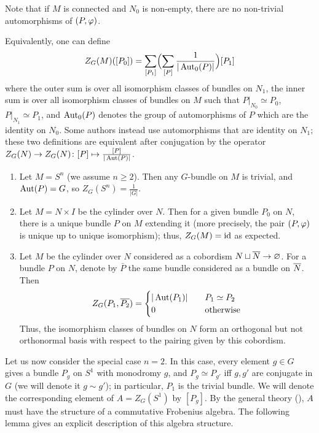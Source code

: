 Note that if $M$ is connected and $N_0$ is non-empty, there are
no non-trivial automorphisms of $(P,\varphi)$.

Equivalently, one can define %
$$
  Z_G(M)([P_0]) = \sum_{[P_1]} \Bigl(
                                    \sum_{[P]} \frac{1}{|\operatorname{Aut}_0(P)|}
                                \Bigr) [P_1]
$$
where the outer sum is over all isomorphism classes of bundles on $N_1$, the
inner sum is over all isomorphism classes of bundles on $M$ such that
$P|_{N_0}\simeq P_0$, $P|_{N_1}\simeq P_1$, and $\operatorname{Aut}_0(P)$ denotes the group of
automorphisms of $P$ which are the identity on $N_0$. Some authors instead use
automorphisms that are identity on $N_1$; these two definitions are equivalent
after conjugation by the operator
$Z_G(N)\to Z_G(N)\colon [P]\mapsto \frac{[P]}{|\operatorname{Aut}(P)|}$.

\begin{example}\label{x:dw-invariants}\par\noindent
  \begin{enumerate}
    \item Let $M=S^n$ (we assume $n\ge 2$). Then any $G$-bundle on $M$ is
      trivial, and $\operatorname{Aut}(P)=G$, so $Z_G(S^n)=\frac{1}{|G|}$.
    \item Let $M=N\times I$ be the cylinder over $N$.
      Then for a given bundle $P_0$ on $N$,
      there is a unique bundle $P$ on $M$ extending it (more precisely, the pair
      $(P, \varphi)$ is unique up to unique isomorphism); thus, $Z_G(M)=\operatorname{id}$ as
      expected.
    \item Let $M$ be the cylinder over $N$ considered as a cobordism $N\sqcup
      \overline{N}\to \varnothing$. For a bundle $P$ on $N$,
      denote by $\bar P$ the same bundle considered as a bundle
      on $\overline{N}$. Then
      $$
      Z_G(P_1, \overline{P_2})=
      \begin{cases}
        |\operatorname{Aut}(P_1)| &\quad P_1\simeq P_2\\
        0 & \quad\text{otherwise}
      \end{cases}
      $$
      Thus, the isomorphism classes of bundles on $N$ form an orthogonal but not
      orthonormal basis with respect to the pairing given by this cobordism.
  \end{enumerate}
\end{example}

Let us now consider the special case $n=2$. In this case, every element $g\in G$
gives a bundle $P_g$ on $S^1$ with monodromy $g$, and $P_g\simeq P_{g'}$ iff $g,
g'$ are conjugate in $G$ (we will denote it $g\sim g'$); in particular, $P_1$ is
the trivial bundle. We will denote the corresponding element of $A=Z_G(S^1)$ by
$[P_g]$. By the general theory (), $A$ must have the
structure of a commutative Frobenius algebra. The following lemma gives an
explicit description of this algebra structure.

